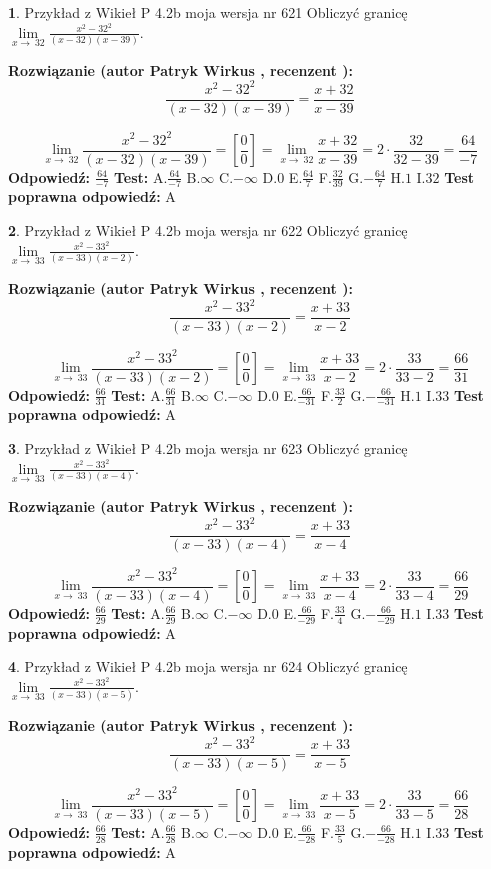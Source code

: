 \documentclass[12pt, a4paper]{article}
\theoremstyle{definition} %
\newtheorem{zad}{}
\newcommand{\zadStart}[1]{\begin{zad}#1\newline}
\newcommand{\zadStop}{\end{zad}}
\newcommand{\rozwStart}[2]{\noindent \textbf{Rozwiązanie (autor #1 , recenzent #2): }\newline}
\newcommand{\rozwStop}{\newline}
\newcommand{\odpStart}{\noindent \textbf{Odpowiedź:}\newline}
\newcommand{\odpStop}{\newline}
\newcommand{\testStart}{\noindent \textbf{Test:}\newline}
\newcommand{\testStop}{\newline}
\newcommand{\kluczStart}{\noindent \textbf{Test poprawna odpowiedź:}\newline}
\newcommand{\kluczStop}{\newline}
\begin{document}
\zadStart{Przykład z Wikieł P 4.2b moja wersja nr 621}
Obliczyć granicę $\lim\limits_{x\to\ 32}\frac{x^{2}-32^{2}}{(x-32)(x-39)}$.
\zadStop
\rozwStart{Patryk Wirkus}{}
$$\frac{x^{2}-32^{2}}{(x-32)(x-39)}=\frac{x+32}{x-39}$$

$$\lim\limits_{x\to\ 32}\frac{x^{2}-32^{2}}{(x-32)(x-39)}=[\frac{0}{0}]=\lim\limits_{x\to\ 32}\frac{x+32}{x-39}=2 \cdot \frac{32}{32-39} = \frac{64}{-7}$$
\rozwStop
\odpStart
$\frac{64}{-7}$
\odpStop
\testStart
A.$\frac{64}{-7}$
B.$\infty$
C.$-\infty$
D.$0$
E.$\frac{64}{7}$
F.$\frac{32}{39}$
G.$-\frac{64}{7}$
H.$1$
I.$32$
\testStop
\kluczStart
A
\kluczStop



\zadStart{Przykład z Wikieł P 4.2b moja wersja nr 622}
Obliczyć granicę $\lim\limits_{x\to\ 33}\frac{x^{2}-33^{2}}{(x-33)(x-2)}$.
\zadStop
\rozwStart{Patryk Wirkus}{}
$$\frac{x^{2}-33^{2}}{(x-33)(x-2)}=\frac{x+33}{x-2}$$

$$\lim\limits_{x\to\ 33}\frac{x^{2}-33^{2}}{(x-33)(x-2)}=[\frac{0}{0}]=\lim\limits_{x\to\ 33}\frac{x+33}{x-2}=2 \cdot \frac{33}{33-2} = \frac{66}{31}$$
\rozwStop
\odpStart
$\frac{66}{31}$
\odpStop
\testStart
A.$\frac{66}{31}$
B.$\infty$
C.$-\infty$
D.$0$
E.$\frac{66}{-31}$
F.$\frac{33}{2}$
G.$-\frac{66}{-31}$
H.$1$
I.$33$
\testStop
\kluczStart
A
\kluczStop



\zadStart{Przykład z Wikieł P 4.2b moja wersja nr 623}
Obliczyć granicę $\lim\limits_{x\to\ 33}\frac{x^{2}-33^{2}}{(x-33)(x-4)}$.
\zadStop
\rozwStart{Patryk Wirkus}{}
$$\frac{x^{2}-33^{2}}{(x-33)(x-4)}=\frac{x+33}{x-4}$$

$$\lim\limits_{x\to\ 33}\frac{x^{2}-33^{2}}{(x-33)(x-4)}=[\frac{0}{0}]=\lim\limits_{x\to\ 33}\frac{x+33}{x-4}=2 \cdot \frac{33}{33-4} = \frac{66}{29}$$
\rozwStop
\odpStart
$\frac{66}{29}$
\odpStop
\testStart
A.$\frac{66}{29}$
B.$\infty$
C.$-\infty$
D.$0$
E.$\frac{66}{-29}$
F.$\frac{33}{4}$
G.$-\frac{66}{-29}$
H.$1$
I.$33$
\testStop
\kluczStart
A
\kluczStop



\zadStart{Przykład z Wikieł P 4.2b moja wersja nr 624}
Obliczyć granicę $\lim\limits_{x\to\ 33}\frac{x^{2}-33^{2}}{(x-33)(x-5)}$.
\zadStop
\rozwStart{Patryk Wirkus}{}
$$\frac{x^{2}-33^{2}}{(x-33)(x-5)}=\frac{x+33}{x-5}$$

$$\lim\limits_{x\to\ 33}\frac{x^{2}-33^{2}}{(x-33)(x-5)}=[\frac{0}{0}]=\lim\limits_{x\to\ 33}\frac{x+33}{x-5}=2 \cdot \frac{33}{33-5} = \frac{66}{28}$$
\rozwStop
\odpStart
$\frac{66}{28}$
\odpStop
\testStart
A.$\frac{66}{28}$
B.$\infty$
C.$-\infty$
D.$0$
E.$\frac{66}{-28}$
F.$\frac{33}{5}$
G.$-\frac{66}{-28}$
H.$1$
I.$33$
\testStop
\kluczStart
A
\kluczStop
\end{document}
